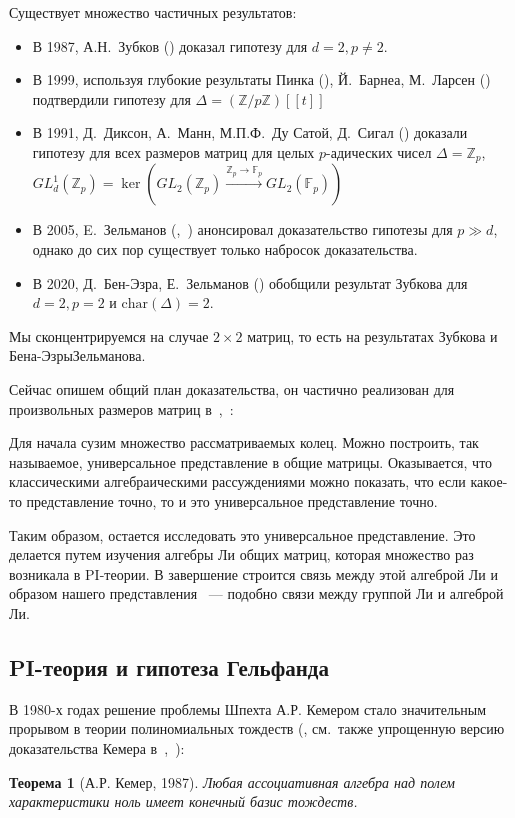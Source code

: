 \documentclass[12pt,a4paper]{article}
\newtheorem*{theorem*}{Теорема}
\begin{document}
    Существует множество частичных результатов:
    \begin{itemize}
        \item В 1987, А.Н.\ Зубков (\cite{Zubkov}) доказал гипотезу для $d=2, p\neq2$.
        \item В 1999, используя глубокие результаты Пинка (\cite{Pink}), Й.\ Барнеа, М.\ Ларсен (\cite{Barnea-Larsen}) подтвердили гипотезу для $\Delta=\left( \mathbb{Z}/p\mathbb{Z} \right)[[t]]$
        \item В 1991, Д.\ Диксон, А.\ Манн, М.П.Ф.\ Ду Сатой, Д.\ Сигал (\cite{DMSD}) доказали гипотезу для всех размеров матриц для целых $p$-адических чисел $\Delta=\mathbb{Z}_p$, $GL_d^1(\mathbb{Z}_p)=\ker\left( GL_2(\mathbb{Z}_p) \xrightarrow{\mathbb{Z}_p\to\mathbb{F}_p} GL_2(\mathbb{F}_p) \right)$
        \item В 2005, E.\ Зельманов (\cite{Zelmanov1},~\cite{Zelmanov2}) анонсировал доказательство гипотезы для $p\gg d$, однако до сих пор существует только набросок доказательства.
        \item В 2020, Д.\ Бен-Эзра, Е.\ Зельманов (\cite{Ben-Ezra-Zelmanov}) обобщили результат Зубкова для $d=2, p=2$ и $\mathrm{char}(\Delta)=2$.
    \end{itemize}

    Мы сконцентрируемся на случае $2\times 2$ матриц, то есть на результатах Зубкова и Бена-Эзры\textemdash Зельманова.

    Сейчас опишем общий план доказательства, он частично реализован для произвольных размеров матриц в\ \cite{Zelmanov1},\ \cite{Zelmanov2}:

    Для начала сузим множество рассматриваемых колец.
    Можно построить, так называемое, универсальное представление в общие матрицы.
    Оказывается, что классическими алгебраическими рассуждениями можно показать, что если какое-то представление точно, то и это универсальное представление точно.

    Таким образом, остается исследовать это универсальное представление.
    Это делается путем изучения алгебры Ли общих матриц, которая множество раз возникала в PI-теории.
    В завершение строится связь между этой алгеброй Ли и образом нашего представления ~--- подобно связи между группой Ли и алгеброй Ли.

    \subsection{PI-теория и гипотеза Гельфанда}
    В 1980-х годах решение проблемы Шпехта А.Р. Кемером стало значительным прорывом в теории полиномиальных тождеств (\cite{Kemer}, см.\ также упрощенную версию доказательства Кемера в~\cite{SimpleKemer},~\cite{Procesi}):
    \vskip 0.1in\noindent
    \begin{theorem*} [А.Р. Кемер, 1987]
        Любая ассоциативная алгебра над полем характеристики ноль имеет конечный базис тождеств.
    \end{theorem*}
    \vskip 0.1in\noindent
\end{document}
